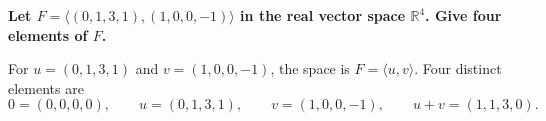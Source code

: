 \providecommand{\rank}{\operatorname{r}}
\providecommand{\RR}{\mathbb R}
\providecommand{\CC}{\mathbb C}
\providecommand{\KK}{\mathbb K}

\setcounter{enumi}{69}
\item {\bfseries\boldmath
Let $F=\langle(0,1,3,1),(1,0,0,-1)\rangle$ in the real vector space $\RR^4$. Give four elements of $F$.
}

\begin{answer}
For $u=(0,1,3,1)$ and $v=(1,0,0,-1)$, the space is $F=\langle u,v\rangle$.
Four distinct elements are
\[
 0=(0,0,0,0),\qquad u=(0,1,3,1),\qquad v=(1,0,0,-1),\qquad
 u+v=(1,1,3,0).
\]
\end{answer}

